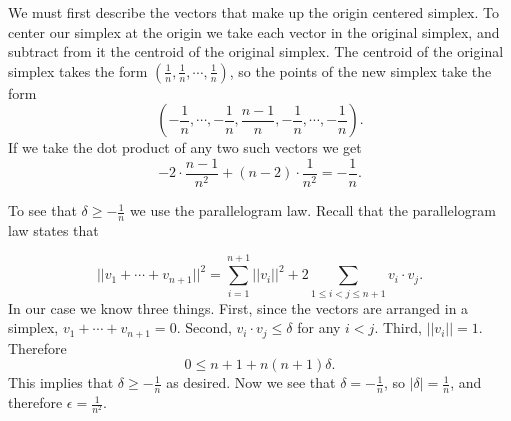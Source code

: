 \documentclass[11pt,letterpaper,twoside,english]{article}
\theoremstyle{theorem}
\theoremstyle{remark}
\begin{document}
We must first describe the vectors that make up the origin centered simplex. To center our simplex at the origin we take each vector in the original simplex, and subtract from it the centroid of the original simplex. The centroid of the original simplex takes the form $(\frac{1}{n},\frac{1}{n},\cdots,\frac{1}{n})$, so the points of the new simplex take the form
$$
\left(-\frac{1}{n},\cdots,-\frac{1}{n},\frac{n-1}{n},-\frac{1}{n},\cdots,-\frac{1}{n}\right).
$$
If we take the dot product of any two such vectors we get
$$
-2\cdot\frac{n-1}{n^2}+(n-2)\cdot\frac{1}{n^2}=-\frac{1}{n}.
$$


To see that $\delta\ge-\frac{1}{n}$ we use the parallelogram law. Recall that the parallelogram law states that 

$$
||v_1+\cdots+v_{n+1}||^2=\displaystyle\sum_{i=1}^{n+1}||v_i||^2+2\displaystyle\sum_{1\le i<j\le n+1}v_i\cdot v_j.
$$
In our case we know three things. First, since the vectors are arranged in a simplex, $v_1+\cdots+v_{n+1}=0$. Second, $v_i\cdot v_j\le\delta$ for any $i<j$. Third, $||v_i||=1$. Therefore 
$$
0\le n+1+n(n+1)\delta.
$$
This implies that $\delta\ge -\frac{1}{n}$ as desired. Now we see that $\delta=-\frac{1}{n}$, so $|\delta|=\frac{1}{n}$, and therefore $\epsilon=\frac{1}{n^2}$. 
\end{document}
